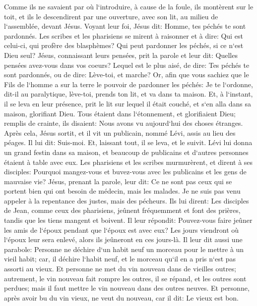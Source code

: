 \verse Comme ils ne savaient par où l`introduire, à cause de la foule, ils montèrent sur le toit, et ils le descendirent par une ouverture, avec son lit, au milieu de l`assemblée, devant Jésus. 
\verse Voyant leur foi, Jésus dit: Homme, tes péchés te sont pardonnés. 
\verse Les scribes et les pharisiens se mirent à raisonner et à dire: Qui est celui-ci, qui profère des blasphèmes? Qui peut pardonner les péchés, si ce n`est Dieu seul? 
\verse Jésus, connaissant leurs pensées, prit la parole et leur dit: Quelles pensées avez-vous dans vos coeurs? 
\verse Lequel est le plus aisé, de dire: Tes péchés te sont pardonnés, ou de dire: Lève-toi, et marche? 
\verse Or, afin que vous sachiez que le Fils de l`homme a sur la terre le pouvoir de pardonner les péchés: Je te l`ordonne, dit-il au paralytique, lève-toi, prends ton lit, et va dans ta maison. 
\verse Et, à l`instant, il se leva en leur présence, prit le lit sur lequel il était couché, et s`en alla dans sa maison, glorifiant Dieu. 
\verse Tous étaient dans l`étonnement, et glorifiaient Dieu; remplis de crainte, ils disaient: Nous avons vu aujourd`hui des choses étranges. 
\verse Après cela, Jésus sortit, et il vit un publicain, nommé Lévi, assis au lieu des péages. Il lui dit: Suis-moi. 
\verse Et, laissant tout, il se leva, et le suivit. 
\verse Lévi lui donna un grand festin dans sa maison, et beaucoup de publicains et d`autres personnes étaient à table avec eux. 
\verse Les pharisiens et les scribes murmurèrent, et dirent à ses disciples: Pourquoi mangez-vous et buvez-vous avec les publicains et les gens de mauvaise vie? 
\verse Jésus, prenant la parole, leur dit: Ce ne sont pas ceux qui se portent bien qui ont besoin de médecin, mais les malades. 
\verse Je ne suis pas venu appeler à la repentance des justes, mais des pécheurs. 
\verse Ils lui dirent: Les disciples de Jean, comme ceux des pharisiens, jeûnent fréquemment et font des prières, tandis que les tiens mangent et boivent. 
\verse Il leur répondit: Pouvez-vous faire jeûner les amis de l`époux pendant que l`époux est avec eux? 
\verse Les jours viendront où l`époux leur sera enlevé, alors ils jeûneront en ces jours-là. 
\verse Il leur dit aussi une parabole: Personne ne déchire d`un habit neuf un morceau pour le mettre à un vieil habit; car, il déchire l`habit neuf, et le morceau qu`il en a pris n`est pas assorti au vieux. 
\verse Et personne ne met du vin nouveau dans de vieilles outres; autrement, le vin nouveau fait rompre les outres, il se répand, et les outres sont perdues; 
\verse mais il faut mettre le vin nouveau dans des outres neuves. 
\verse Et personne, après avoir bu du vin vieux, ne veut du nouveau, car il dit: Le vieux est bon. 

